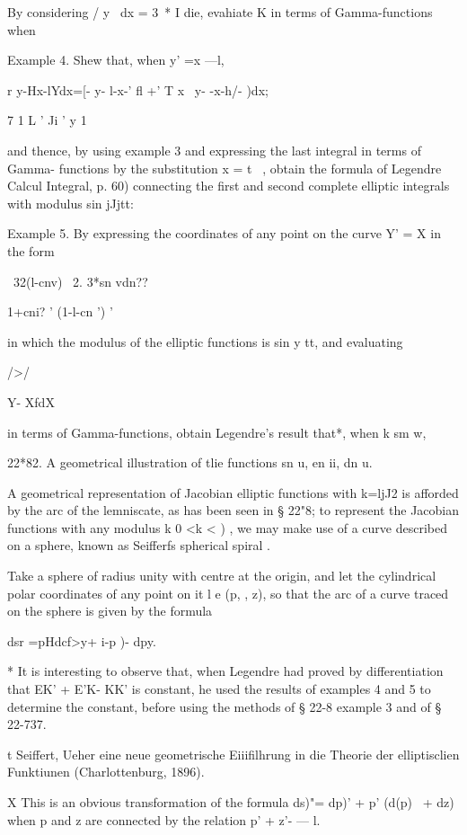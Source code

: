By considering / y~ dx = 3~* I die, evahiate K in terms of
Gamma-functions when

Example 4. Shew that, when y' =x —l,

r y-Hx-lYdx=[- y- l-x-' fl +' T x~ y- -x-h/- )dx;

7 1 L ' Ji ' y 1

and thence, by using example 3 and expressing the last integral in
terms of Gamma- functions by the substitution x = t~ , obtain the
formula of Legendre Calcul Integral, p. 60) connecting the first and
second complete elliptic integrals with modulus sin jJjtt:

Example 5. By expressing the coordinates of any point on the curve Y'
= X in the form

 \ 32(l-cnv) \ 2. 3*sn vdn??

1+cni? ' (1-l-cn ') '

in which the modulus of the elliptic functions is sin y tt, and
evaluating

 />/

Y- XfdX

in terms of Gamma-functions, obtain Legendre's result that*, when k sm
w,

22*82. A geometrical illustration of tlie functions sn u, en ii, dn u.

A geometrical representation of Jacobian elliptic functions with
k=ljJ2 is afforded by the arc of the lemniscate, as has been seen in §
22"8; to represent the Jacobian functions with any modulus k 0 <k < )
, we may make use of a curve described on a sphere, known as Seifferfs
spherical spiral .

Take a sphere of radius unity with centre at the origin, and let the
cylindrical polar coordinates of any point on it l e (p, , z), so that
the arc of a curve traced on the sphere is given by the formula \

 dsr =pHdcf>y+ i-p )- dpy.

* It is interesting to observe that, when Legendre had proved by
differentiation that EK' + E'K- KK' is constant, he used the results
of examples 4 and 5 to determine the constant, before using the
methods of § 22-8 example 3 and of § 22-737.

t Seiffert, Ueher eine neue geometrische Eiiifilhrung in die Theorie
der elliptisclien Funktiunen (Charlottenburg, 1896).

X This is an obvious transformation of the formula ds)"= dp)' + p'
(d(p)~ + dz) when p and z are connected by the relation p' + z'- — l.

